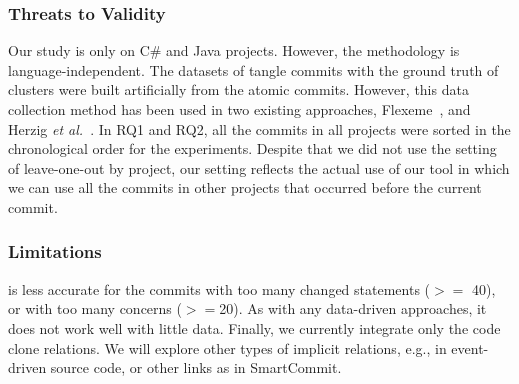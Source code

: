 \subsubsection{{\bf Threats to Validity}}
\label{threats:sec}


Our study is only on C\# and Java projects. However, the methodology
is language-independent. The datasets of tangle commits with the
ground truth of clusters were built artificially from the atomic
commits. However, this data collection method has been used in two
existing approaches, Flexeme~\cite{flexeme-fse20}, and Herzig
{\em et al.}~\cite{kim-msr13}. In RQ1 and RQ2, all the commits in all
projects were sorted in the chronological order for the
experiments. Despite that we did not use the setting of leave-one-out
by project, our setting reflects the actual use of our tool in which
we can use all the commits in other projects that occurred before the
current commit.

\subsubsection{{\bf Limitations}}
{\tool} is less accurate for the commits with too many changed
statements ($>=$ 40), or with too many concerns ($>=$20). As with any
data-driven approaches, it does not work well with little
data. Finally, we currently integrate only the code clone
relations. We will explore other types of implicit relations, e.g., in
event-driven source code, or other links as in SmartCommit.


